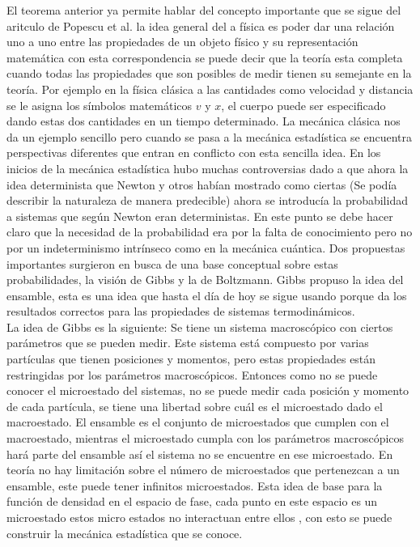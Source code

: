 El teorema anterior ya permite hablar del concepto importante que se sigue del aritculo de Popescu et al. la idea general del a física es poder dar una relación uno a uno entre las propiedades de un objeto físico y su representación matemática con esta correspondencia se puede decir que la teoría esta completa cuando todas las propiedades que son posibles de medir tienen su semejante en la teoría. Por ejemplo en la física clásica a las cantidades como velocidad y distancia se le asigna los símbolos matemáticos $v$ y $x$, el cuerpo puede ser especificado dando estas dos cantidades en un tiempo determinado. La mecánica clásica nos da un ejemplo sencillo pero cuando se pasa a la mecánica estadística se encuentra perspectivas diferentes que entran en conflicto con esta sencilla idea. En los inicios de la mecánica estadística hubo muchas controversias dado a que ahora la idea determinista que Newton y otros habían mostrado como ciertas (Se podía describir la naturaleza de manera predecible) ahora se introducía la probabilidad a sistemas que según Newton eran deterministas. En este punto se debe hacer claro que la necesidad de la probabilidad era por la falta de conocimiento pero no por un indeterminismo intrínseco como en la mecánica cuántica. Dos propuestas importantes surgieron en busca de una base conceptual sobre estas probabilidades, la visión de Gibbs y la de Boltzmann. Gibbs propuso la idea del ensamble, esta es una idea que hasta el día de hoy se sigue usando porque da los resultados correctos para las propiedades de sistemas termodinámicos.\\
La idea de Gibbs es la siguiente: Se tiene un sistema macroscópico con ciertos parámetros que se pueden medir. Este sistema está compuesto por varias partículas que tienen posiciones y momentos, pero estas propiedades están restringidas por los parámetros macroscópicos. Entonces como no se puede conocer el microestado del sistemas, no se puede medir cada posición y momento de cada partícula, se tiene una libertad sobre cuál es el microestado dado el macroestado. El ensamble es el conjunto de microestados que cumplen con el macroestado, mientras el microestado cumpla con los parámetros macroscópicos hará parte del ensamble así el sistema no se encuentre en ese microestado. En teoría no hay limitación sobre el número de microestados que pertenezcan a un ensamble, este puede tener infinitos microestados. Esta idea de base para la función de densidad en el espacio de fase, cada punto en este espacio es un microestado estos micro estados no interactuan entre ellos , con esto se puede construir la mecánica estadística que se conoce. 
